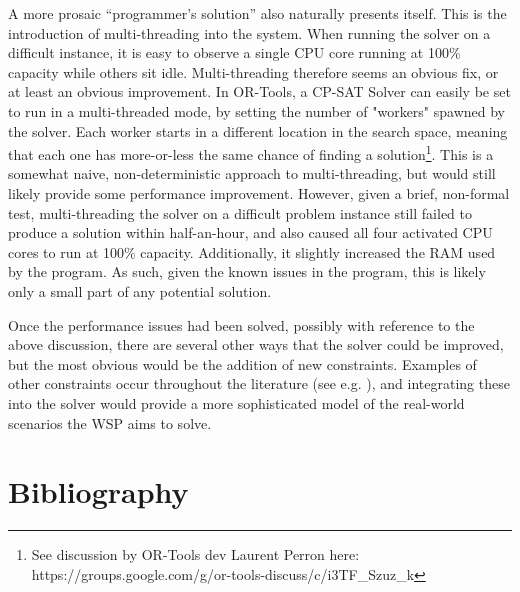 \documentclass[11pt]{article}
\begin{document}
			A more prosaic ``programmer's solution'' also naturally presents itself. This is the introduction of multi-threading into the system.
			When running the solver on a difficult instance, it is easy to observe a single CPU core running at 100\% capacity while others sit idle.
			Multi-threading therefore seems an obvious fix, or at least an obvious improvement.
			In OR-Tools, a CP-SAT Solver can easily be set to run in a multi-threaded mode,
			by setting the number of "workers" spawned by the solver. Each worker starts in a different location in the search space,
			meaning that each one has more-or-less the same chance of finding a solution\footnote{See discussion by OR-Tools dev Laurent Perron here: https://groups.google.com/g/or-tools-discuss/c/i3TF\_Szuz\_k}.
			This is a somewhat naive, non-deterministic approach to multi-threading, but would still likely provide some performance improvement.
			However, given a brief, non-formal test, multi-threading the solver on a difficult problem instance still failed to produce a solution within half-an-hour,
			and also caused all four activated CPU cores to run at 100\% capacity. Additionally, it slightly increased the RAM used by the program.
			As such, given the known issues in the program, this is likely only a small part of any potential solution.

			Once the performance issues had been solved, possibly with reference to the above discussion,
			there are several other ways that the solver could be improved, but the most obvious would be the addition of new constraints.
			Examples of other constraints occur throughout the literature (see e.g.\cite{cohen14} \cite{karapetyan19}),
			and integrating these into the solver would provide a more sophisticated model of the real-world scenarios the WSP aims to solve.

	\section{Bibliography}
	
	
\end{document}
